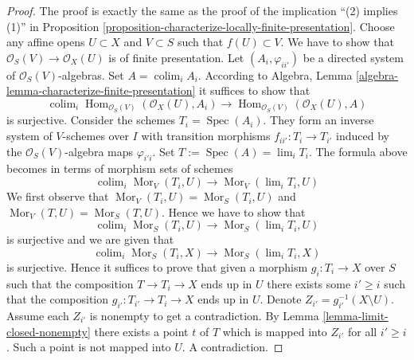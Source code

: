 \documentclass[10pt,a4paper]{amsart}
\theoremstyle{plain}
\theoremstyle{definition}
\theoremstyle{remark}
\numberwithin{equation}{subsection}
\def\lim{\mathop{\mathrm{lim}}\nolimits}
\def\colim{\mathop{\mathrm{colim}}\nolimits}
\def\Spec{\mathop{\mathrm{Spec}}}
\def\Hom{\mathop{\mathrm{Hom}}\nolimits}
\def\Mor{\mathop{\mathrm{Mor}}\nolimits}
\begin{document}
\begin{proof}
The proof is exactly the same as the proof of the implication
``(2) implies (1)'' in
Proposition \ref{proposition-characterize-locally-finite-presentation}.
Choose any affine opens $U \subset X$ and $V \subset S$ such that
$f(U) \subset V$. We have to show that
$\mathcal{O}_S(V) \to \mathcal{O}_X(U)$ is of finite presentation.
Let $(A_i, \varphi_{ii'})$ be a directed system of
$\mathcal{O}_S(V)$-algebras. Set $A = \colim_i A_i$.
According to
Algebra, Lemma \ref{algebra-lemma-characterize-finite-presentation}
it suffices to show that
$$
\colim_i \Hom_{\mathcal{O}_S(V)}(\mathcal{O}_X(U), A_i) \to
\Hom_{\mathcal{O}_S(V)}(\mathcal{O}_X(U), A)
$$
is surjective. Consider the schemes $T_i = \Spec(A_i)$. They
form an inverse system of $V$-schemes over $I$
with transition morphisms $f_{ii'} : T_i \to T_{i'}$
induced by the $\mathcal{O}_S(V)$-algebra maps $\varphi_{i'i}$.
Set $T := \Spec(A) = \lim_i T_i$.
The formula above becomes in terms of morphism sets of schemes
$$
\colim_i \Mor_V(T_i, U) \to \Mor_V(\lim_i T_i, U)
$$
We first observe that
$\Mor_V(T_i, U) = \Mor_S(T_i, U)$
and
$\Mor_V(T, U) = \Mor_S(T, U)$.
Hence we have to show that
$$
\colim_i \Mor_S(T_i, U) \to
\Mor_S(\lim_i T_i, U)
$$
is surjective and we are given that
$$
\colim_i \Mor_S(T_i, X) \to
\Mor_S(\lim_i T_i, X)
$$
is surjective.
Hence it suffices to prove that given a morphism $g_i : T_i \to X$ over $S$
such that the composition $T \to T_i \to X$ ends up in $U$ there exists some
$i' \geq i$ such that the composition $g_{i'} : T_{i'} \to T_i \to X$ ends up
in $U$. Denote $Z_{i'} = g_{i'}^{-1}(X \setminus U)$.
Assume each $Z_{i'}$ is nonempty
to get a contradiction. By Lemma \ref{lemma-limit-closed-nonempty}
there exists a point $t$ of $T$ which is mapped into $Z_{i'}$ for all
$i' \geq i$. Such a point is not mapped into $U$. A contradiction.
\end{proof}
\end{document}
